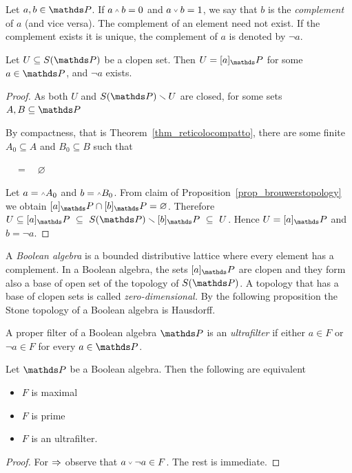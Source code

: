 Let $a,b\in\PP$.
If $a\swedge  b=0$ and $a\svee b=1$, we say that $b$ is the \emph{complement\/} of $a$ (and vice versa).
The complement of an element need not exist.
If the complement exists it is unique, the complement of $a$ is denoted by \emph{$\neg a$}.

\begin{lemma}\label{Stone_aperti_chiusi}
Let $U\subseteq S(\PP)$ be a clopen set.
Then $U=[a]_\PP$ for some $a\in\PP$, and $\neg a$ exists.
\end{lemma}

\begin{proof}
As both $U$ and $S(\PP)\sm U$ are closed, for some sets $A, B\subseteq\PP$




By compactness, that is Theorem~\ref{thm_reticolocompatto}, there are some finite $A_0\subseteq A$ and $B_0\subseteq B$ such that

$\quad=\quad\varnothing$

Let $a=\swedge A_0$ and $b=\swedge B_0$.
From claim  of Proposition~\ref{prop_brouwerstopology} we obtain $[a]_\PP\cap[b]_\PP=\varnothing$.
Therefore $U\subseteq [a]_\PP\ \subseteq\ S(\PP)\sm  [b]_\PP\ \subseteq\ U$.
Hence $U= [a]_\PP$ and $b=\neg a$.
\end{proof}

A \emph{Boolean algebra\/} is a bounded distributive lattice where every element has a complement.
In a Boolean algebra, the sets $[a]_\PP$ are clopen and they form also a base of open set of the topology of $S(\PP)$.
A topology that has a base of clopen sets is called \emph{zero-dimensional.}
By the following proposition the Stone topology of a Boolean algebra is Hausdorff.

A proper filter of a Boolean algebra $\PP$ is an \emph{ultrafilter\/} if either $a\in F$ or $\neg a\in F$ for every $a\in\PP$.

\begin{proposition}
Let $\PP$ be a Boolean algebra.
Then the following are equivalent
\begin{itemize}
\item[1.] $F$ is maximal
\item[2.] $F$ is prime
\item[3.] $F$ is an ultrafilter.
\end{itemize}
\end{proposition}
\begin{proof}
For $\Rightarrow$ observe that $a\svee\neg a\in F$.
The rest is immediate.
\end{proof}

